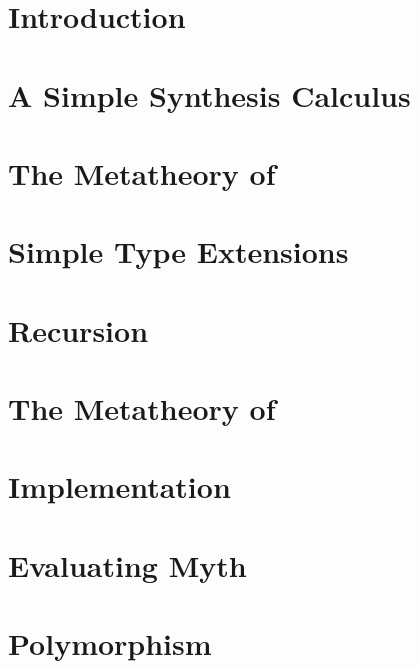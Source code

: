 \chapter{Introduction}
\label{ch:introduction}


\chapter{A Simple Synthesis Calculus}
\label{ch:a-simple-synthesis-calculus}


\chapter{The Metatheory of \texorpdfstring{\lsyn{}}{λsyn}}
\label{ch:metatheory-of-lsyn}


\chapter{Simple Type Extensions}
\label{ch:simple-type-extensions}


\chapter{Recursion}
\label{ch:recursion}


\chapter{The Metatheory of \texorpdfstring{\mlsyn{}}{MLsyn}}
\label{ch:metatheory-of-mlsyn}


\chapter{Implementation}
\label{ch:implementation}


\chapter{Evaluating Myth}
\label{ch:evaluating-myth}


\chapter{Polymorphism}
\label{ch:polymorphism}


